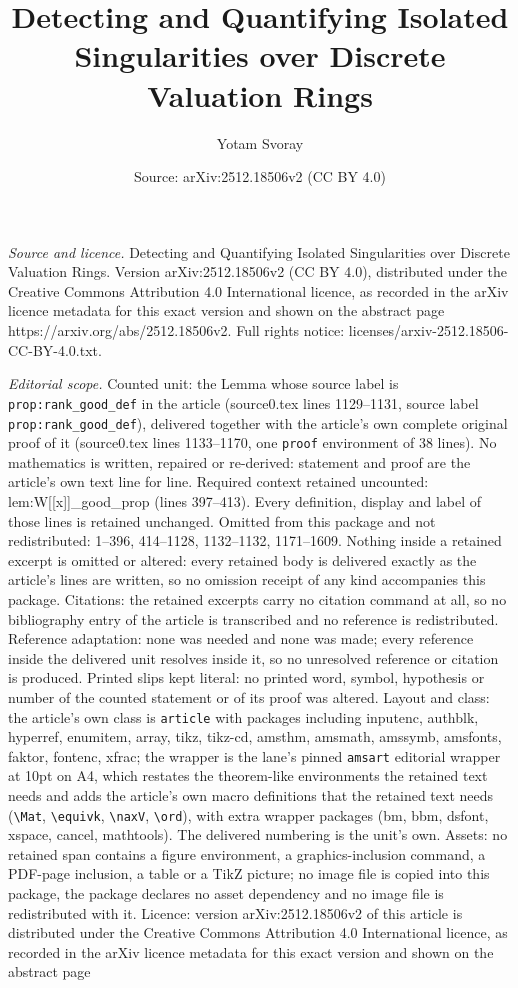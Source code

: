 \documentclass[10pt,a4paper]{amsart}
\title[Detecting and Quantifying Isolated Singularities over Discre]{Detecting and Quantifying Isolated Singularities over Discrete Valuation Rings}
\author{Yotam Svoray}
\date{Source: arXiv:2512.18506v2 (CC BY 4.0)}
\begin{document}
\maketitle

\noindent\emph{Source and licence.} Detecting and Quantifying Isolated Singularities over Discrete Valuation Rings. Version arXiv:2512.18506v2 (CC BY 4.0), distributed under the Creative Commons Attribution 4.0 International licence, as recorded in the arXiv licence metadata for this exact version and shown on the abstract page https://arxiv.org/abs/2512.18506v2. Full rights notice: licenses/arxiv-2512.18506-CC-BY-4.0.txt.\par\smallskip

\noindent\textit{Editorial scope.} Counted unit: the Lemma whose source label is \texttt{prop:rank\_good\_def} in the article (source0.tex lines 1129--1131, source label \texttt{prop:rank\_good\_def}), delivered together with the article's own complete original proof of it (source0.tex lines 1133--1170, one \texttt{proof} environment of 38 lines). No mathematics is written, repaired or re-derived: statement and proof are the article's own text line for line. Required context retained uncounted: lem:W[[x]]\_good\_prop (lines 397--413). Every definition, display and label of those lines is retained unchanged. Omitted from this package and not redistributed: 1--396, 414--1128, 1132--1132, 1171--1609. Nothing inside a retained excerpt is omitted or altered: every retained body is delivered exactly as the article's lines are written, so no omission receipt of any kind accompanies this package. Citations: the retained excerpts carry no citation command at all, so no bibliography entry of the article is transcribed and no reference is redistributed. Reference adaptation: none was needed and none was made; every reference inside the delivered unit resolves inside it, so no unresolved reference or citation is produced. Printed slips kept literal: no printed word, symbol, hypothesis or number of the counted statement or of its proof was altered. Layout and class: the article's own class is \texttt{article} with packages including inputenc, authblk, hyperref, enumitem, array, tikz, tikz-cd, amsthm, amsmath, amssymb, amsfonts, faktor, fontenc, xfrac; the wrapper is the lane's pinned \texttt{amsart} editorial wrapper at 10pt on A4, which restates the theorem-like environments the retained text needs and adds the article's own macro definitions that the retained text needs (\texttt{\textbackslash Mat}, \texttt{\textbackslash equivk}, \texttt{\textbackslash naxV}, \texttt{\textbackslash ord}), with extra wrapper packages (bm, bbm, dsfont, xspace, cancel, mathtools). The delivered numbering is the unit's own. Assets: no retained span contains a figure environment, a graphics-inclusion command, a PDF-page inclusion, a table or a TikZ picture; no image file is copied into this package, the package declares no asset dependency and no image file is redistributed with it. Licence: version arXiv:2512.18506v2 of this article is distributed under the Creative Commons Attribution 4.0 International licence, as recorded in the arXiv licence metadata for this exact version and shown on the abstract page 
\end{document}
